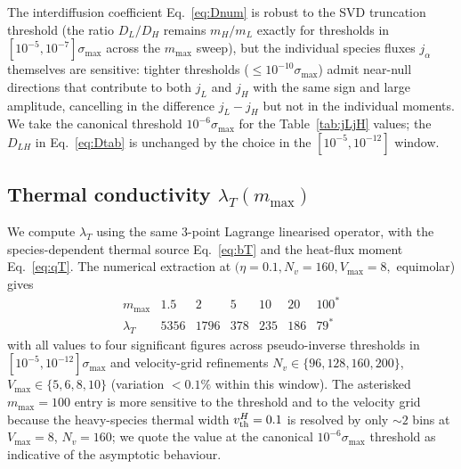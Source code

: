 \documentclass[aps,pre,twocolumn,superscriptaddress,longbibliography,floatfix]{revtex4-2}
\begin{document}
The interdiffusion coefficient Eq.~\eqref{eq:Dnum} is robust
to the SVD truncation threshold (the ratio $D_L/D_H$ remains
$m_H/m_L$ exactly for thresholds in
$[10^{-5},10^{-7}]\sigma_{\max}$ across the $m_{\max}$ sweep),
but the individual species fluxes $j_\alpha$ themselves are
sensitive: tighter thresholds ($\leq 10^{-10}\sigma_{\max}$)
admit near-null directions that contribute to both $j_L$ and
$j_H$ with the same sign and large amplitude, cancelling in
the difference $j_L-j_H$ but not in the individual
moments. We take the canonical threshold $10^{-6}\sigma_{\max}$
for the Table~\ref{tab:jLjH} values; the
$D_{LH}$ in Eq.~\eqref{eq:Dtab} is unchanged by the choice in
the $[10^{-5},10^{-12}]$ window.

\subsection{Thermal conductivity $\lambda_T(m_{\max})$}

We compute $\lambda_T$ using the same 3-point Lagrange
linearised operator, with the species-dependent thermal source
Eq.~\eqref{eq:bT} and the heat-flux moment Eq.~\eqref{eq:qT}.
The numerical extraction at $(\eta=0.1, N_v=160, V_{\max}=8,$
equimolar) gives
\begin{equation}
\begin{array}{c|cccccc}
m_{\max} & 1.5 & 2 & 5 & 10 & 20 & 100^* \\
\hline
\lambda_T & 5356 & 1796 & 378 & 235 & 186 & 79^*
\end{array}
\label{eq:lambdaT}
\end{equation}
with all values to four significant figures across
pseudo-inverse thresholds in $[10^{-5},10^{-12}]\sigma_{\max}$
and velocity-grid refinements $N_v\in\{96,128,160,200\}$,
$V_{\max}\in\{5,6,8,10\}$ (variation $<0.1\%$ within this
window). The asterisked $m_{\max}=100$ entry is more
sensitive to the threshold and to the velocity grid because
the heavy-species thermal width $v_{\rm th}^H=0.1$ is
resolved by only $\sim 2$ bins at $V_{\max}=8$, $N_v=160$;
we quote the value at the canonical $10^{-6}\sigma_{\max}$
threshold as indicative of the asymptotic behaviour.
\end{document}
